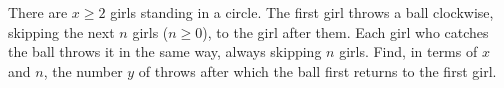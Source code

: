 There are $x\ge2$ girls standing in a circle. The first girl throws a ball clockwise, skipping the next $n$ girls ($n\ge0$), to the girl after them. Each girl who catches the ball throws it in the same way, always skipping $n$ girls. Find, in terms of $x$ and $n$, the number $y$ of throws after which the ball first returns to the first girl.
